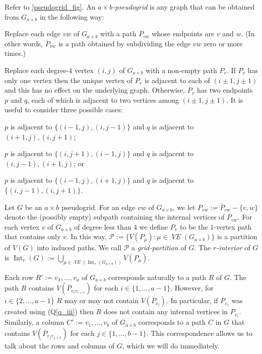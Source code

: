 \documentclass{patmorin}
\DeclareMathOperator{\interior}{Int}
\newcommand{\defin}[1]{\emph{\color{brightmaroon}#1}}
\DeclareMathOperator{\VE}{\mathit{VE}}
\begin{document}
Refer to \cref{pseudogrid_fig}.  An \defin{$a\times b$-pseudogrid} is any graph that can be obtained from $G_{a\times b}$ in the following way:
\begin{compactitem}
  \item Replace each edge $vw$ of $G_{a\times b}$ with a path $\overline{P}_{vw}$ whose endpoints are $v$ and $w$.  (In other words, $\overline{P}_{vw}$ is a path obtained by subdividing the edge $vw$ zero or more times.)
  \item Replace each degree-$4$ vertex $(i,j)$ of $G_{a\times b}$ with a non-empty path $P_v$. If $P_v$ has only one vertex then the unique vertex of $P_v$ is adjacent to each of $(i\pm 1,j\pm 1)$ and this has no effect on the underlying graph.  Otherwise, $P_v$ has two endpoints $p$ and $q$, each of which is adjacent to two vertices among $(i\pm 1,j\pm 1)$.  It is useful to consider three possible cases:
  \begin{compactenum}[(Q1)]
    \item \label{q_i} $p$ is adjacent to $\{(i-1,j), (i,j-1)\}$ and $q$ is adjacent to $(i+1,j),(i,j+1)$;
    \item \label{q_ii} $p$ is adjacent to $\{(i,j+1), (i-1,j)\}$ and $q$ is adjacent to $(i,j-1),(i+1,j)$; or
    \item \label{q_iii} $p$ is adjacent to $\{(i-1,j),(i+1,j)\}$ and $q$ is adjacent to $\{(i,j-1),(i,j+1)\}$.
  \end{compactenum}
\end{compactitem}

Let $G$ be an $a\times b$ pseudogrid.  For an edge $vw$ of $G_{a\times b}$, we let $P_{vw}:=\overline{P}_{vw}-\{v,w\}$ denote the (possibly empty) subpath containing the internal vertices of $\overline{P}_{vw}$.  For each vertex $v$ of $G_{a\times b}$ of degree less than $4$ we define $P_{v}$ to be the $1$-vertex path that contains only $v$.  In this way, $\mathcal{P}:=\{V(P_\mu):\mu\in \VE(G_{a\times b})\}$ is a partition of $V(G)$ into induced paths.  We call $\mathcal{P}$ a \defin{grid-partition} of $G$.
The \defin{$r$-interior} of $G$ is $\interior_r(G):=\bigcup_{\mu\in\VE(\interior_r(G_{a\times b}))} V(P_\mu)$.


Each row $R':=v_1,\ldots,v_a$ of $G_{a\times b}$ corresponds naturally to a path $R$ of $G$. The path $R$ contains $V(\overline{P}_{v_iv_{i+1}})$ for each $i\in\{1,\ldots,a-1\}$.  However, for $i\in\{2,\ldots,a-1\}$ $R$ may or may not contain $V(P_{v_i})$.  In particular, if $P_{v_i}$ was created using (Q\ref{q_iii}) then $R$ does not contain any internal vertices in $P_{v_i}$. Similarly, a column $C':=v_1,\ldots,v_b$ of $G_{a\times b}$ corresponds to a path $C$  in $G$ that contains $V(\overline{P}_{v_jv_{j+1}})$ for each $j\in\{1,\ldots,b-1\}$. This correspondence allows us to talk about the rows and columns of $G$, which we will do immediately.
\end{document}
